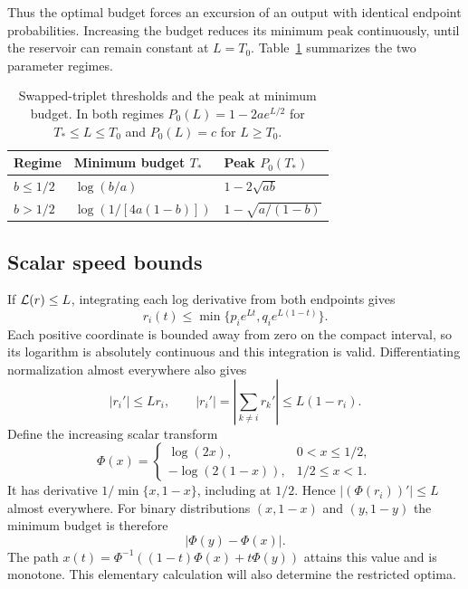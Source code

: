 Thus the optimal budget forces an excursion of an output with identical endpoint probabilities. Increasing the budget reduces its minimum peak continuously, until the reservoir can remain constant at $L=T_0$. Table~\ref{tab:frontier} summarizes the two parameter regimes.

\begin{table}[ht]
\caption{Swapped-triplet thresholds and the peak at minimum budget. In both regimes $P_0(L)=1-2ae^{L/2}$ for $T_*\le L\le T_0$ and $P_0(L)=c$ for $L\ge T_0$.}
\label{tab:frontier}
\centering
\begin{tabular}{@{}lll@{}}
\toprule
Regime & Minimum budget $T_*$ & Peak $P_0(T_*)$\\
\midrule
$b\le1/2$ & $\log(b/a)$ & $1-2\sqrt{ab}$\\[3pt]
$b>1/2$ & $\log(1/[4a(1-b)])$ & $1-\sqrt{a/(1-b)}$\\
\bottomrule
\end{tabular}
\end{table}

\subsection{Scalar speed bounds}
If $\mathcal L(r)\le L$, integrating each log derivative from both endpoints gives
\begin{equation}\label{eq:envelope}
 r_i(t)\le\min\{p_i e^{Lt},q_i e^{L(1-t)}\}.
\end{equation}
Each positive coordinate is bounded away from zero on the compact interval, so its logarithm is absolutely continuous and this integration is valid. Differentiating normalization almost everywhere also gives
\begin{equation}\label{eq:binaryspeed}
 |r_i'|\le Lr_i,\qquad
 |r_i'|=\left|\sum_{k\ne i}r_k'\right|\le L(1-r_i).
\end{equation}
Define the increasing scalar transform
\begin{equation}\label{eq:phi}
 \Phi(x)=\begin{cases}
 \log(2x),&0<x\le1/2,\\
 -\log(2(1-x)),&1/2\le x<1.
 \end{cases}
\end{equation}
It has derivative $1/\min\{x,1-x\}$, including at $1/2$. Hence
$|(\Phi(r_i))'|\le L$ almost everywhere. For binary distributions $(x,1-x)$ and $(y,1-y)$ the minimum budget is therefore
\begin{equation}\label{eq:binarydistance}
 |\Phi(y)-\Phi(x)|.
\end{equation}
The path $x(t)=\Phi^{-1}((1-t)\Phi(x)+t\Phi(y))$ attains this value and is monotone. This elementary calculation will also determine the restricted optima.

